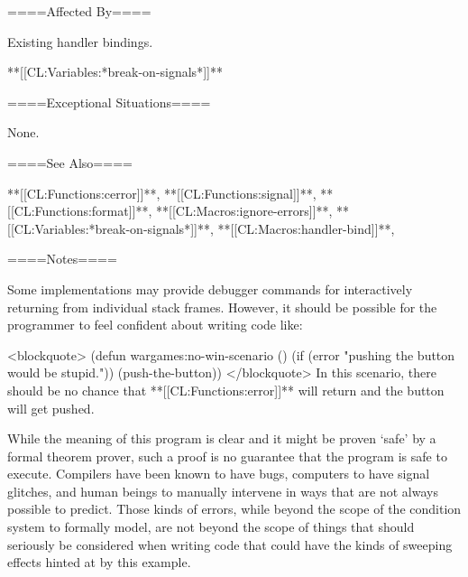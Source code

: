 ====Affected By====

Existing handler bindings.

**[[CL:Variables:*break-on-signals*]]**

====Exceptional Situations====

None.


====See Also====

**[[CL:Functions:cerror]]**, **[[CL:Functions:signal]]**, **[[CL:Functions:format]]**, **[[CL:Macros:ignore-errors]]**, **[[CL:Variables:*break-on-signals*]]**, **[[CL:Macros:handler-bind]]**, {\secref\ConditionSystemConcepts}

====Notes====

Some implementations may provide debugger commands for interactively returning from individual stack frames. However, it should be possible for the programmer to feel confident about writing code like:

<blockquote> (defun wargames:no-win-scenario () (if (error "pushing the button would be stupid.")) (push-the-button)) </blockquote> In this scenario, there should be no chance that **[[CL:Functions:error]]** will return and the button will get pushed.

While the meaning of this program is clear and it might be proven `safe' by a formal theorem prover, such a proof is no guarantee that the program is safe to execute. Compilers have been known to have bugs, computers to have signal glitches, and human beings to manually intervene in ways that are not always possible to predict. Those kinds of errors, while beyond the scope of the condition system to formally model, are not beyond the scope of things that should seriously be considered when writing code that could have the kinds of sweeping effects hinted at by this example.

